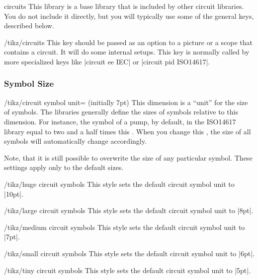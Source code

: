 \documentclass[a4paper]{ltxdoc}
\begin{document}
\begin{tikzlibrary}{circuits}
 This library is a base library that is included by other circuit
 libraries. You do not include it directly, but you will typically
 use some of the general keys, described below.
\end{tikzlibrary}

\begin{key}{/tikz/circuits}
 This key should be passed as an option to a picture or a scope that
 contains a circuit. It will do some internal setups. This key is
 normally called by more specialized keys like |circuit ee IEC| or |circuit pid ISO14617|.
\end{key}

\subsubsection{Symbol Size}

\begin{key}{/tikz/circuit symbol unit= (initially 7pt)}
 This dimension is a ``unit'' for the size of symbols. The libraries
 generally define the sizes of symbols relative to this
 dimension. For instance, the symbol of a pump, by
 default, in the ISO14617 library equal to two and a half times this
 . When you change this , the size of
 all symbols will automatically change accordingly.

 Note, that it is still possible to overwrite the size of any
 particular symbol. These settings apply only to the default sizes.

 \begin{codeexample}[]
 \end{codeexample}
\end{key}

\begin{stylekey}{/tikz/huge circuit symbols}
 This style sets the default circuit symbol unit to |10pt|.
\end{stylekey}
\begin{stylekey}{/tikz/large circuit symbols}
 This style sets the default circuit symbol unit to |8pt|.
\end{stylekey}
\begin{stylekey}{/tikz/medium circuit symbols}
 This style sets the default circuit symbol unit to |7pt|.
\end{stylekey}
\begin{stylekey}{/tikz/small circuit symbols}
 This style sets the default circuit symbol unit to |6pt|.
\end{stylekey}
\begin{stylekey}{/tikz/tiny circuit symbols}
 This style sets the default circuit symbol unit to |5pt|.
\end{stylekey}
\end{document}
